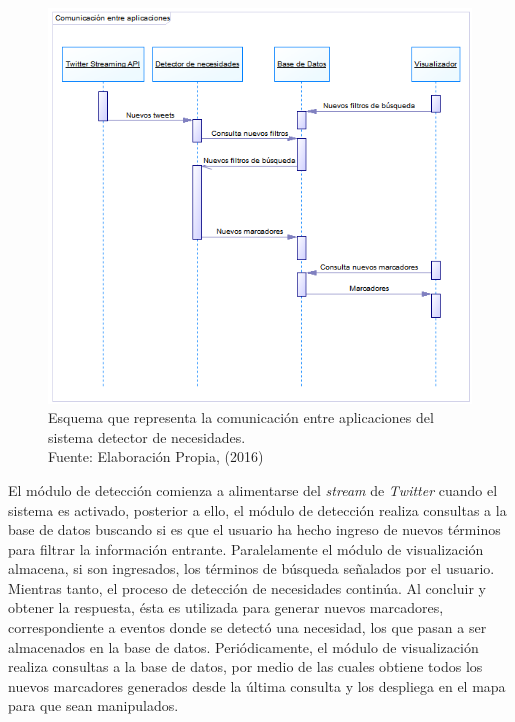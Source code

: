 \begin{figure}[H]
	\centering
	\captionsetup{justification=centering}
	\includegraphics[scale=0.8]{images/ComunicacionFinal.png}
	\caption[Esquema que representa la comunicación entre aplicaciones del sistema detector de necesidades.]{Esquema que representa la comunicación entre aplicaciones del sistema detector de necesidades.\\Fuente: Elaboración Propia, (2016)}
	\label{fig:comunFinal}
\end{figure}

El módulo de detección comienza a alimentarse del \textit{stream} de \textit{Twitter} cuando el sistema es activado, posterior a ello, el módulo de detección realiza consultas a la base de datos buscando si es que el usuario ha hecho ingreso de nuevos términos para filtrar la información entrante. Paralelamente el módulo de visualización almacena, si son ingresados, los términos de búsqueda señalados por el usuario. Mientras tanto, el proceso de detección de necesidades continúa. Al concluir y obtener la respuesta, ésta es utilizada para generar nuevos marcadores, correspondiente a eventos donde se detectó una necesidad, los que pasan a ser almacenados en la base de datos. Periódicamente, el módulo de visualización realiza consultas a la base de datos, por medio de las cuales obtiene todos los nuevos marcadores generados desde la última consulta y los despliega en el mapa para que sean manipulados.

